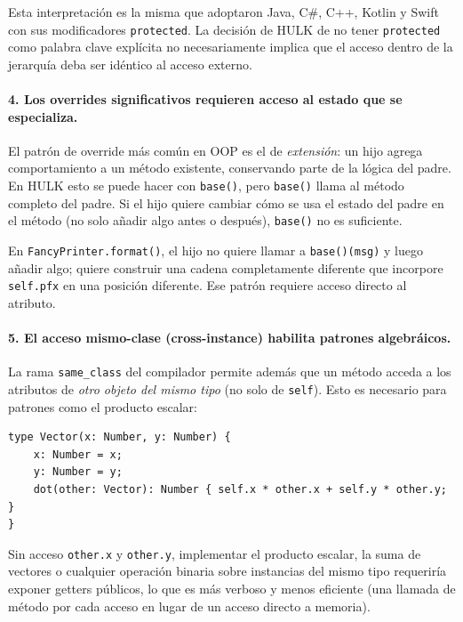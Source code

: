\documentclass[12pt,letterpaper]{article}
\newcommand{\hulk}{\textsc{HULK}}
\newcommand{\src}[1]{\texttt{#1}}
\begin{document}
Esta interpretación es la misma que adoptaron Java, C\#, C++, Kotlin y Swift con sus modificadores \src{protected}. La decisión de \hulk{} de no tener \src{protected} como palabra clave explícita no necesariamente implica que el acceso dentro de la jerarquía deba ser idéntico al acceso externo.

\paragraph{4. Los overrides significativos requieren acceso al estado que se especializa.}

El patrón de override más común en OOP es el de \emph{extensión}: un hijo agrega comportamiento a un método existente, conservando parte de la lógica del padre. En \hulk{} esto se puede hacer con \src{base()}, pero \src{base()} llama al método completo del padre. Si el hijo quiere cambiar cómo se usa el estado del padre en el método (no solo añadir algo antes o después), \src{base()} no es suficiente.

En \src{FancyPrinter.format()}, el hijo no quiere llamar a \src{base()(msg)} y luego añadir algo; quiere construir una cadena completamente diferente que incorpore \src{self.pfx} en una posición diferente. Ese patrón requiere acceso directo al atributo.

\paragraph{5. El acceso mismo-clase (cross-instance) habilita patrones algebráicos.}

La rama \src{same\_class} del compilador permite además que un método acceda a los atributos de \emph{otro objeto del mismo tipo} (no solo de \src{self}). Esto es necesario para patrones como el producto escalar:

\begin{lstlisting}[language=HULK,caption={vector\_math.hulk: acceso cross-instance al mismo tipo}]
type Vector(x: Number, y: Number) {
    x: Number = x;
    y: Number = y;
    dot(other: Vector): Number { self.x * other.x + self.y * other.y; }
}
\end{lstlisting}

Sin acceso \src{other.x} y \src{other.y}, implementar el producto escalar, la suma de vectores o cualquier operación binaria sobre instancias del mismo tipo requeriría exponer getters públicos, lo que es más verboso y menos eficiente (una llamada de método por cada acceso en lugar de un acceso directo a memoria).
\end{document}
